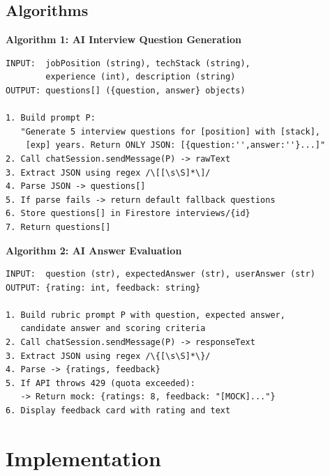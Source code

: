 \documentclass{fisatprojectfinal}
\begin{document}
\section{Algorithms}

\textbf{Algorithm 1: AI Interview Question Generation}
\begin{verbatim}
INPUT:  jobPosition (string), techStack (string),
        experience (int), description (string)
OUTPUT: questions[] ({question, answer} objects)

1. Build prompt P:
   "Generate 5 interview questions for [position] with [stack],
    [exp] years. Return ONLY JSON: [{question:'',answer:''}...]"
2. Call chatSession.sendMessage(P) -> rawText
3. Extract JSON using regex /\[[\s\S]*\]/
4. Parse JSON -> questions[]
5. If parse fails -> return default fallback questions
6. Store questions[] in Firestore interviews/{id}
7. Return questions[]
\end{verbatim}

\textbf{Algorithm 2: AI Answer Evaluation}
\begin{verbatim}
INPUT:  question (str), expectedAnswer (str), userAnswer (str)
OUTPUT: {rating: int, feedback: string}

1. Build rubric prompt P with question, expected answer,
   candidate answer and scoring criteria
2. Call chatSession.sendMessage(P) -> responseText
3. Extract JSON using regex /\{[\s\S]*\}/
4. Parse -> {ratings, feedback}
5. If API throws 429 (quota exceeded):
   -> Return mock: {ratings: 8, feedback: "[MOCK]..."}
6. Display feedback card with rating and text
\end{verbatim}

\chapter{Implementation}
\end{document}
